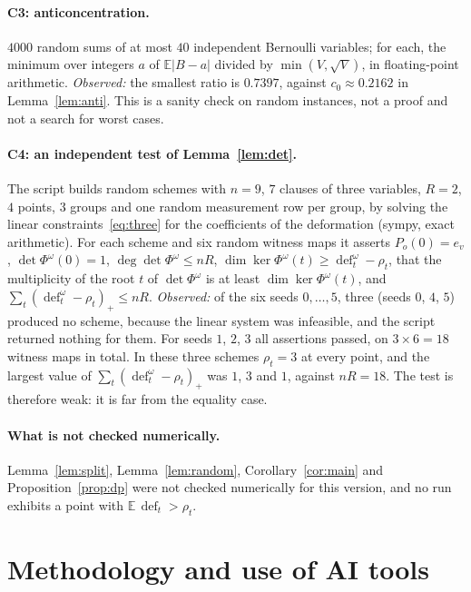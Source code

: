 \documentclass[11pt,a4paper]{article}
\theoremstyle{definition}
\theoremstyle{remark}
\newcommand{\E}{\mathbb{E}}
\newcommand{\dfc}{\operatorname{def}}
\begin{document}
\paragraph{C3: anticoncentration.} $4000$ random sums of at most $40$ independent Bernoulli
variables; for each, the minimum over integers $a$ of $\E|B-a|$ divided by
$\min(V,\sqrt V)$, in floating-point arithmetic. \emph{Observed:} the smallest ratio is
$0.7397$, against $c_0\approx0.2162$ in Lemma~\ref{lem:anti}. This is a sanity check on
random instances, not a proof and not a search for worst cases.

\paragraph{C4: an independent test of Lemma~\ref{lem:det}.} The script builds random schemes
with $n=9$, $7$ clauses of three variables, $R=2$, $4$ points, $3$ groups and one random
measurement row per group, by solving the linear constraints~\eqref{eq:three} for the
coefficients of the deformation (sympy, exact arithmetic). For each scheme and six random
witness maps it asserts $P_o(0)=e_v$, $\det\Phi^\omega(0)=1$, $\deg\det\Phi^\omega\le nR$,
$\dim\ker\Phi^\omega(t)\ge\dfc^\omega_t-\rho_t$, that the multiplicity of the root $t$ of
$\det\Phi^\omega$ is at least $\dim\ker\Phi^\omega(t)$, and
$\sum_t(\dfc^\omega_t-\rho_t)_+\le nR$. \emph{Observed:} of the six seeds $0,\dots,5$, three
(seeds $0$, $4$, $5$) produced no scheme, because the linear system was infeasible, and the
script returned nothing for them. For seeds $1$, $2$, $3$ all assertions passed, on
$3\times6=18$ witness maps in total. In these three schemes $\rho_t=3$ at every point, and
the largest value of $\sum_t(\dfc^\omega_t-\rho_t)_+$ was $1$, $3$ and $1$, against $nR=18$.
The test is therefore weak: it is far from the equality case.

\paragraph{What is not checked numerically.} Lemma~\ref{lem:split},
Lemma~\ref{lem:random}, Corollary~\ref{cor:main} and Proposition~\ref{prop:dp} were not
checked numerically for this version, and no run exhibits a point with
$\E\,\dfc_t>\rho_t$.

\section{Methodology and use of AI tools}\label{sec:ai}
\end{document}
